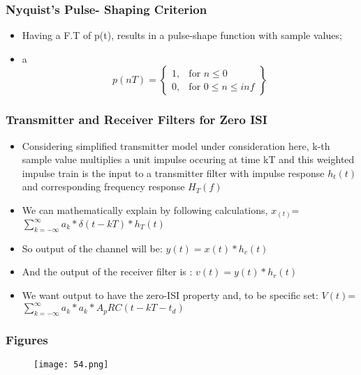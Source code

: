 \documentclass{beamer}
\begin{document}
			\begin{frame}
			\frametitle{Nyquist's Pulse- Shaping Criterion}
			\begin{itemize}
			\item Having a F.T of p(t), results in a pulse-shape function with sample values;
			\item a
			\[
    p(nT) = \left\{\begin{array}{lr}
        1, & \text{for } n\leq 0\\
        0, & \text{for } 0\leq n\leq inf
        \end{array}\right\} 
  \]
  			\end{itemize}
			\end{frame}
			
  			\begin{frame}
			\frametitle{Transmitter and Receiver Filters for Zero ISI}
			\begin{itemize} 
			\item Considering simplified transmitter model under consideration here, k-th sample value multiplies a unit impulse occuring at time kT and this weighted impulse train is the input to a transmitter filter with impulse response $h_t(t)$ and corresponding frequency response $H_T(f)$
			\item We can mathematically explain by following calculations,  $x_(t)$=$\sum_{k=-\infty}^{\infty} a_k*\delta(t-kT)*h_T(t) $
			\item So output of the channel will be: $y(t)= x(t)*h_c(t)$
			\item And the output of the receiver filter is : $v(t)=y(t)*h_r(t)$
			\item  We want output to have the zero-ISI property and, to be specific set: $V(t)$=$\sum_{k=-\infty}^{\infty} a_k*a_k*A_pRC(t-kT-t_d) $
			\end{itemize}
			\end{frame}
			
			\begin{frame}
			\frametitle{Figures}
			\begin{figure}
			\texttt{[image: 54.png]}
			\end{figure}
			\end{frame}
					
			
\end{document}
